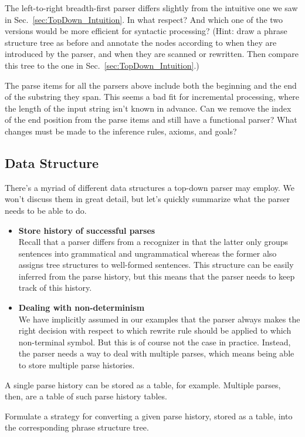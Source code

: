 %
\begin{exercise}
    The left-to-right breadth-first parser differs slightly from the intuitive one we saw in Sec.~\ref{sec:TopDown_Intuition}.
    In what respect?
    And which one of the two versions would be more efficient for syntactic processing?
    (Hint: draw a phrase structure tree as before and annotate the nodes according to when they are introduced by the parser, and when they are scanned or rewritten.
    Then compare this tree to the one in Sec.~\ref{sec:TopDown_Intuition}.)
\end{exercise}
%
\begin{exercise}
    The parse items for all the parsers above include both the beginning and the end of the substring they span.
    This seems a bad fit for incremental processing, where the length of the input string isn't known in advance.
    Can we remove the index of the end position from the parse items and still have a functional parser?
    What changes must be made to the inference rules, axioms, and goals?
\end{exercise}

\subsection{Data Structure}
\label{sub:TopDown_Data}
There's a myriad of different data structures a top-down parser may employ.
We won't discuss them in great detail, but let's quickly summarize what the parser needs to be able to do.
%
\begin{itemize}
    \item \textbf{Store history of successful parses}\\
        Recall that a parser differs from a recognizer in that the latter only groups sentences into grammatical and ungrammatical whereas the former also assigns tree structures to well-formed sentences.
        This structure can be easily inferred from the parse history, but this means that the parser needs to keep track of this history.
    \item \textbf{Dealing with non-determinism}\\
        We have implicitly assumed in our examples that the parser always makes the right decision with respect to which rewrite rule should be applied to which non-terminal symbol.
        But this is of course not the case in practice.
        Instead, the parser needs a way to deal with multiple parses, which means being able to store multiple parse histories.
\end{itemize}
%
A single parse history can be stored as a table, for example.
Multiple parses, then, are a table of such parse history tables.
%
\begin{exercise}
    Formulate a strategy for converting a given parse history, stored as a table, into the corresponding phrase structure tree.
\end{exercise}


